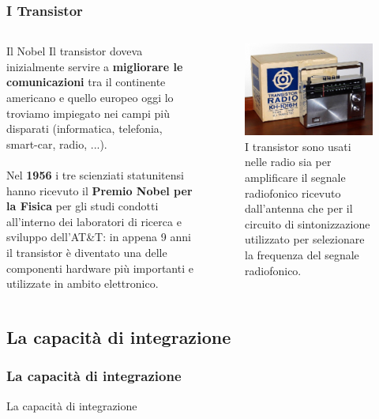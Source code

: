 \begin{frame}
	\frametitle{I Transistor}
	
	\begin{columns}			
		\begin{block}{Il Nobel}
			Il transistor doveva inizialmente servire a \textbf{migliorare le comunicazioni} tra il continente americano e quello europeo oggi lo troviamo impiegato nei campi più disparati (informatica, telefonia, smart-car, radio, ...).\\~\\
			Nel \textbf{1956} i tre scienziati statunitensi hanno ricevuto il \textbf{Premio Nobel per la Fisica} per gli studi condotti all'interno dei laboratori di ricerca e sviluppo dell'AT\&T: in appena 9 anni il transistor è diventato una delle componenti hardware più importanti e utilizzate in ambito elettronico.
		\end{block}
		
		\begin{figure}[!htbp]
			\centering 
			\includegraphics[width=0.95\linewidth]{images/2_le_architetture/radio_transistors.jpeg}
			\caption{I transistor sono usati nelle radio sia per amplificare il segnale radiofonico   ricevuto dall'antenna che per il circuito di sintonizzazione utilizzato per selezionare la frequenza del segnale radiofonico.}
		\end{figure}		
	\end{columns}
	
\end{frame}


\subsection[La capacità di integrazione]{La capacità di integrazione}
\begin{frame}
	\frametitle{La capacità di integrazione}
	
	\begin{block}{La capacità di integrazione}
	
	\end{block}
	
\end{frame}


